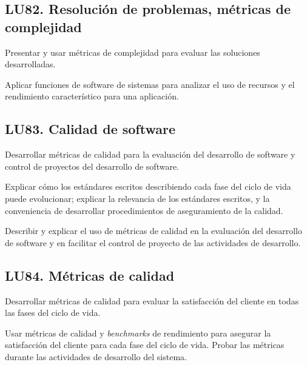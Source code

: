 \subsection{LU82. Resolución de problemas, métricas de complejidad}\label{sec:BOK-LU82}\label{sec:LU82}
\begin{LearningUnit}
\begin{LUGoal}
\item Presentar y usar métricas de complejidad para evaluar las soluciones desarrolladas.
\end{LUGoal}

\begin{LUObjective}
\item Aplicar funciones de software de sistemas para analizar el uso de recursos y el rendimiento característico para una aplicación.
\end{LUObjective}
\end{LearningUnit}

\subsection{LU83. Calidad de software}\label{sec:BOK-LU83}\label{sec:LU83}
\begin{LearningUnit}
\begin{LUGoal}
\item Desarrollar métricas de calidad para la evaluación del desarrollo de software y control de proyectos del desarrollo de software.
\end{LUGoal}

\begin{LUObjective}
\item Explicar cómo los estándares escritos describiendo cada fase del ciclo de vida puede evolucionar; explicar la relevancia de los estándares escritos, y la conveniencia de desarrollar procedimientos de aseguramiento de la calidad.
\item Describir y explicar el uso de métricas de calidad en la evaluación del desarrollo de software y en facilitar el control de proyecto de las actividades de desarrollo.
\end{LUObjective}
\end{LearningUnit}

\subsection{LU84. Métricas de calidad}\label{sec:BOK-LU84}\label{sec:LU84}
\begin{LearningUnit}
\begin{LUGoal}
\item Desarrollar métricas de calidad para evaluar la satisfacción del cliente en todas las fases del ciclo de vida.
\end{LUGoal}

\begin{LUObjective}
\item Usar métricas de calidad y \textit{benchmarks} de rendimiento para asegurar la satisfacción del cliente para cada fase del ciclo de vida. Probar las métricas durante las actividades de desarrollo del sistema.
\end{LUObjective}
\end{LearningUnit}


